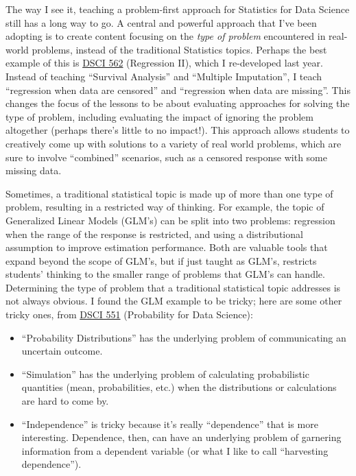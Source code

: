 \documentclass[]{article}
\providecommand{\tightlist}{%
  \setlength{\itemsep}{0pt}\setlength{\parskip}{0pt}}
\begin{document}
The way I see it, teaching a problem-first approach for Statistics for Data Science still has a long way to go. A central and powerful approach that I've been adopting is to create content focusing on the \emph{type of problem} encountered in real-world problems, instead of the traditional Statistics topics. Perhaps the best example of this is \href{https://ubc-mds.github.io/DSCI_562_regr-2/}{DSCI 562} (Regression II), which I re-developed last year. Instead of teaching ``Survival Analysis'' and ``Multiple Imputation'', I teach ``regression when data are censored'' and ``regression when data are missing''. This changes the focus of the lessons to be about evaluating approaches for solving the type of problem, including evaluating the impact of ignoring the problem altogether (perhaps there's little to no impact!). This approach allows students to creatively come up with solutions to a variety of real world problems, which are sure to involve ``combined'' scenarios, such as a censored response with some missing data.

Sometimes, a traditional statistical topic is made up of more than one type of problem, resulting in a restricted way of thinking. For example, the topic of Generalized Linear Models (GLM's) can be split into two problems: regression when the range of the response is restricted, and using a distributional assumption to improve estimation performance. Both are valuable tools that expand beyond the scope of GLM's, but if just taught as GLM's, restricts students' thinking to the smaller range of problems that GLM's can handle.
Determining the type of problem that a traditional statistical topic addresses is not always obvious. I found the GLM example to be tricky; here are some other tricky ones, from \href{https://ubc-mds.github.io/DSCI_551_stat-prob-dsci/lectures/}{DSCI 551} (Probability for Data Science):

\begin{itemize}
\tightlist
\item
  ``Probability Distributions'' has the underlying problem of communicating an uncertain outcome.
\item
  ``Simulation'' has the underlying problem of calculating probabilistic quantities (mean, probabilities, etc.) when the distributions or calculations are hard to come by.
\item
  ``Independence'' is tricky because it's really ``dependence'' that is more interesting. Dependence, then, can have an underlying problem of garnering information from a dependent variable (or what I like to call ``harvesting dependence'').
\end{itemize}
\end{document}
